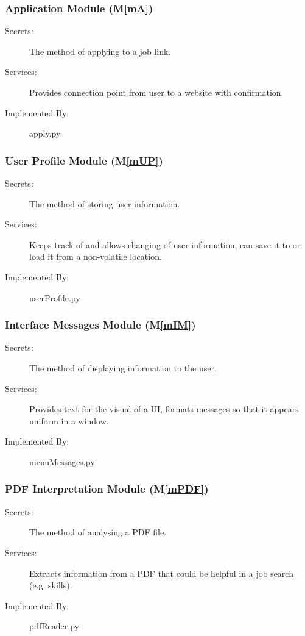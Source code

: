 \documentclass[12pt, titlepage]{article}
\newcommand{\mref}[1]{M\ref{#1}}
\begin{document}
\subsubsection{Application Module (\mref{mA})}

\begin{description}
\item[Secrets:] The method of applying to a job link.
\item[Services:] Provides connection point from user to a website with confirmation.
\item[Implemented By:] apply.py
\end{description}

\subsubsection{User Profile Module (\mref{mUP})}

\begin{description}
\item[Secrets:] The method of storing user information.
\item[Services:] Keeps track of and allows changing of user information, can save it to or load it from a non-volatile location.
\item[Implemented By:] userProfile.py
\end{description}

\subsubsection{Interface Messages Module (\mref{mIM})}

\begin{description}
\item[Secrets:] The method of displaying information to the user.
\item[Services:] Provides text for the visual of a UI, formats messages so that it appears uniform in a window.
\item[Implemented By:] menuMessages.py
\end{description}

\subsubsection{PDF Interpretation Module (\mref{mPDF})}

\begin{description}
\item[Secrets:] The method of analysing a PDF file.
\item[Services:] Extracts information from a PDF that could be helpful in a job search (e.g. skills).
\item[Implemented By:] pdfReader.py
\end{description}
\end{document}
